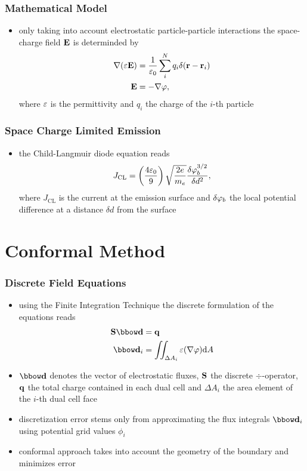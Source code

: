 \documentclass[colorbacktitle,inverttitle,landscape,presentation,
	english,
	aspectratio=43, %
	accentcolor=tud9b, %
]{tudbeamer}
\begin{document}
\begin{frame}
\frametitle{Mathematical Model}
	\begin{itemize}	
	\item only taking into account electrostatic particle-particle interactions the space-charge field $ \mathbf{E} $ is determinded by
	\begin{align*}
	\nabla(\varepsilon \mathbf{E} ) &= \frac{1}{\varepsilon_0}\sum_i^N q_i \delta( \mathbf{r} - \mathbf{r} _i)\\
	 \mathbf{E}  &= -\nabla \varphi,
	\end{align*}
	where $\varepsilon$ is the permittivity and $q_i$ the charge of the $i$-th particle	
	\end{itemize}
\end{frame}

\begin{frame}
\frametitle{Space Charge Limited Emission}
	\begin{itemize}
	\item the Child-Langmuir diode equation reads
	\begin{align*}
	J_\mathrm{CL} = \left(\frac{4 \varepsilon_0}{9}\right) \sqrt{\frac{2 e}{m_e}} \frac{\delta \varphi_b^{3/2}}{\delta d^2},
	\end{align*}
	where $J_\mathrm{CL}$ is the current at the emission surface and $\delta\varphi_b$ the local potential difference at a distance $\delta d$ from the surface
	\end{itemize}		
\end{frame}


\section{Conformal Method}
\begin{frame}
\frametitle{Discrete Field Equations}	
	\begin{itemize}
	\item using the Finite Integration Technique the discrete formulation of the equations reads
	\begin{align*}
	\divfit \dfit &= \qfit\\
	\dfit_i &= \iint_{\Delta A_i} \eps(\nabla \phifield)\dA
	\end{align*}
	
	\item $\dfit$ denotes the vector of electrostatic fluxes, $\mathbf{S}$ the discrete $\div$-operator, $\mathrm{\mathbf{q}}$ the total charge contained in each dual cell and $\Delta A_i$ the area element of the $i$-th dual cell face
	
	\item discretization error stems only from approximating the flux integrals $\dfit_i$ using potential grid values $\phi_i$
	
	\item conformal approach takes into account the geometry of the boundary and minimizes error
	\end{itemize}
\end{frame}
\end{document}

